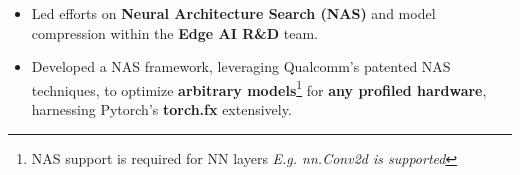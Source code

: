 \documentclass[10pt,a4paper,ragged2e,withhyper]{altacv}
\begin{document}

\begin{paracol}{2}


    \makecvheader{}

    \vspace{-4pt}



    \begin{itemize}
        \item Led efforts on \textbf{Neural Architecture Search (NAS)} and model compression within the \textbf{Edge AI R\&D} team.

        \item Developed a NAS framework, leveraging Qualcomm's patented NAS
              techniques, to optimize \textbf{arbitrary models}\footnote*{NAS support
                  is required for NN layers \hspace{0.6ex} \textit{E.g. nn.Conv2d is
                      supported}} for \textbf{any profiled hardware}, harnessing Pytorch's
              \textbf{torch.fx} extensively.


\end{itemize}
\end{paracol}
\end{document}

